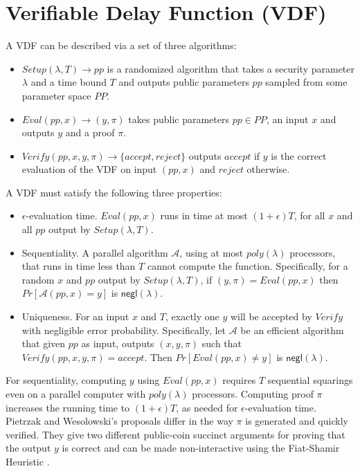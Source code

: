 \documentclass[letterpaper,twocolumn,10pt]{article}
\theoremstyle{definition}
\theoremstyle{remark}
\begin{document}
\section{Verifiable Delay Function (VDF)}
\label{appendix:vdf}
A VDF \cite{boneh2018verifiable} can be described via a set of three algorithms:
\begin{itemize}
\item $Setup(\lambda, T) \rightarrow pp$ is a randomized algorithm that takes a security parameter $\lambda$ and a time bound $T$  and outputs public parameters $pp$ sampled from some parameter space $PP$.
\item $Eval(pp, x) \rightarrow (y, \pi)$ takes public parameters $pp\in PP$, an input $x$ and outputs $y$ and a proof $\pi$.
\item $Verify(pp, x, y, \pi) \rightarrow \{accept, reject\}$ outputs $accept$ if $y$ is the correct evaluation of the VDF on input $(pp, x)$ and $reject$ otherwise.
\end{itemize}

A VDF must satisfy the following three properties:
\begin{itemize}
\item $\epsilon$-evaluation time. $Eval(pp, x)$ runs in time at most $(1 + \epsilon) T$, for all $x$ and all $pp$ output by $Setup(\lambda, T)$.
\item Sequentiality. A parallel algorithm $\mathcal{A}$, using at most $poly(\lambda)$ processors, that runs in time less than $T$ cannot compute the function. Specifically, for a random $x$ and $pp$ output by $Setup(\lambda, T)$, if $(y, \pi) = Eval(pp, x)$ then $Pr[\mathcal{A}(pp, x) = y]$ is $\mathsf{negl(\lambda)}$.
\item Uniqueness. For an input $x$ and $T$, exactly one $y$ will be accepted by $Verify$ with negligible error probability. Specifically, let $\mathcal{A}$ be an efficient algorithm that given $pp$ as input, outputs $(x, y, \pi)$ such that $Verify(pp, x, y, \pi) = accept$. Then $Pr[Eval(pp, x) \neq y]$ is $\mathsf{negl(\lambda)}$.
\end{itemize}
For sequentiality, computing $y$ using $Eval(pp,x)$ requires $T$ sequential squarings even on a parallel computer with $poly(\lambda)$ processors. Computing proof $\pi$ increases the running time to $(1+\epsilon)T$, as needed for $\epsilon$-evaluation time. Pietrzak \cite{pietrzak2018simple} and Wesolowski's \cite{wesolowski2019efficient} proposals differ in the way $\pi$ is generated and quickly verified. They give two different public-coin succinct arguments for proving that the output $y$ is correct and can be made non-interactive using the Fiat-Shamir Heuristic \cite{amos1986prove}. 
\end{document}

